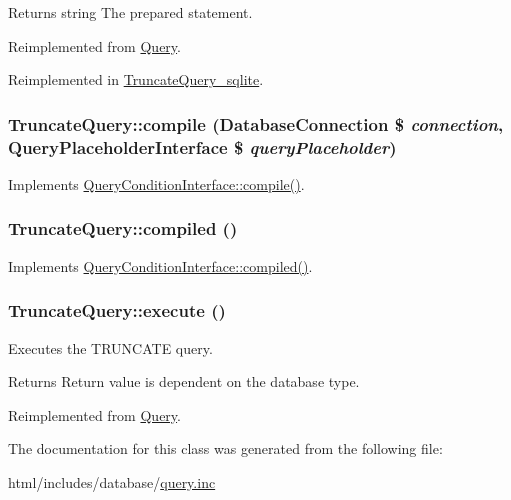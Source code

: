 \begin{DoxyReturn}{Returns}
string The prepared statement. 
\end{DoxyReturn}


Reimplemented from \hyperlink{classQuery_a16c3a3265666b784d49ce18a6fda9a8a}{Query}.

Reimplemented in \hyperlink{classTruncateQuery__sqlite_a5b051a5c4f35a4c8e91cb7ecb38f7dcf}{TruncateQuery\_\-sqlite}.\hypertarget{classTruncateQuery_a052d10a3c9d1089483ee94b30f65514a}{
\subsubsection[{compile}]{\setlength{\rightskip}{0pt plus 5cm}TruncateQuery::compile ({\bf DatabaseConnection} \$ {\em connection}, \/  {\bf QueryPlaceholderInterface} \$ {\em queryPlaceholder})}}
\label{classTruncateQuery_a052d10a3c9d1089483ee94b30f65514a}
Implements \hyperlink{interfaceQueryConditionInterface_ad409672ac9ac50787eec52ecdf5a60b1}{QueryConditionInterface::compile()}. \hypertarget{classTruncateQuery_ac29862ff0fcdc347618e2d79ddd94418}{
\subsubsection[{compiled}]{\setlength{\rightskip}{0pt plus 5cm}TruncateQuery::compiled ()}}
\label{classTruncateQuery_ac29862ff0fcdc347618e2d79ddd94418}
Implements \hyperlink{interfaceQueryConditionInterface_a4aac3f4505275edecad9c22351e591cb}{QueryConditionInterface::compiled()}. \hypertarget{classTruncateQuery_acc0ca130114686d1ddf4d3315f720c0e}{
\subsubsection[{execute}]{\setlength{\rightskip}{0pt plus 5cm}TruncateQuery::execute ()}}
\label{classTruncateQuery_acc0ca130114686d1ddf4d3315f720c0e}
Executes the TRUNCATE query.

\begin{DoxyReturn}{Returns}
Return value is dependent on the database type. 
\end{DoxyReturn}


Reimplemented from \hyperlink{classQuery_a9f2326187a94f3337a7838687b1e6929}{Query}.

The documentation for this class was generated from the following file:\begin{DoxyCompactItemize}
\item 
html/includes/database/\hyperlink{query_8inc}{query.inc}\end{DoxyCompactItemize}
